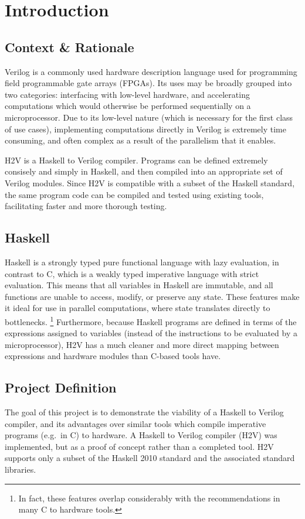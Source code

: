 \documentclass[english,onecolumn]{scrartcl}
\begin{document}
\section{Introduction}

\subsection{Context \& Rationale}
Verilog is a commonly used hardware description language used for programming field programmable gate arrays (FPGAs).
Its uses may be broadly grouped into two categories: interfacing with low-level hardware, and accelerating computations which
would otherwise be performed sequentially on a microprocessor. Due to its low-level nature (which is necessary for the first class
of use cases), implementing computations directly in Verilog is extremely time consuming, and often complex as a result of the
parallelism that it enables.

H2V is a Haskell to Verilog compiler. Programs can be defined extremely consisely and simply in Haskell, and then compiled into an
appropriate set of Verilog modules. Since H2V is compatible with a subset of the Haskell standard, the same program code can be
compiled and tested using existing tools, facilitating faster and more thorough testing.

\subsection{Haskell}
Haskell is a strongly typed pure functional language with lazy evaluation, in contrast to C, which is a weakly typed imperative
language with strict evaluation. This means that all variables in Haskell are immutable, and all functions are unable to access,
modify, or preserve any state. These features make it ideal for use in parallel computations, where state translates directly to
bottlenecks.%
\footnote{In fact, these features overlap considerably with the recommendations in many C to hardware tools.\cite{C2H_UG}}
Furthermore, because Haskell programs are defined in terms of the expressions assigned to variables (instead of the instructions
to be evaluated by a microprocessor), H2V has a much cleaner and more direct mapping between expressions and hardware modules than
C-based tools have.


\subsection{Project Definition}
The goal of this project is to demonstrate the viability of a Haskell to Verilog compiler, and its advantages over similar tools
which compile imperative programs (e.g.\ in C) to hardware. A Haskell to Verilog compiler (H2V) was implemented, but as a proof of
concept rather than a completed tool. H2V supports only a subset of the Haskell 2010 standard and the associated standard
libraries.
\end{document}
